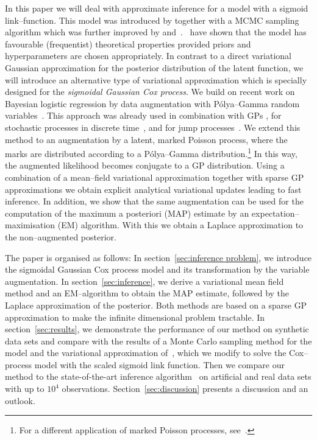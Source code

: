 \documentclass[twoside,11pt]{article}
\begin{document}
In this paper we will deal with approximate inference for a model with a sigmoid link--function.  This model was introduced by \citep{adams2009tractable} together with a MCMC sampling algorithm which was further improved by \citep{gunter2014efficient} and~\citep{teh2011gaussian}.~\citet{kirichenko2015optimality} have shown that the model has favourable (frequentist) theoretical properties provided priors and hyperparameters are chosen appropriately. In contrast to a direct variational Gaussian approximation for the posterior distribution of the latent function, we will introduce an alternative type of variational approximation which is specially designed for the {\em sigmoidal Gaussian Cox process}. We build on recent work on Bayesian logistic regression by data augmentation with P\'olya--Gamma random variables~\citep{polson2013bayesian}. This approach was already used in combination with GPs \citep{linderman2015dependent, wenzel2017scalable}, for stochastic processes in discrete time~\citep{linderman2017bayesian}, and for jump processes~\citep{donner2017inverse}. We extend this method to an augmentation by a latent, marked Poisson process, where the marks are distributed according to a P\'olya--Gamma distribution.\footnote{For a different application of marked Poisson processes, see~\citep{lloyd2016latent}.} In this way, the augmented likelihood becomes conjugate to a GP distribution. Using a combination of a mean--field variational approximation together with sparse GP approximations \citep{csato2002sparse,csato2002phd,titsias2009variational} we obtain explicit analytical variational updates leading to fast inference. In addition, we show that the same augmentation can be used for the computation of the maximum a posteriori (MAP) estimate by an expectation--maximisation (EM) algorithm. With this we obtain a Laplace approximation to the non--augmented posterior.

The paper is organised as follows: In section~\ref{sec:inference problem}, we introduce the sigmoidal Gaussian Cox process model and its transformation by the variable augmentation. In section~\ref{sec:inference}, we derive a variational mean field method and an EM--algorithm to obtain the MAP estimate, followed by the Laplace approximation of the posterior. Both methods are based on a sparse GP approximation to make the infinite dimensional problem tractable. In section~\ref{sec:results}, we demonstrate the  performance of our method on synthetic data sets and compare with the results of a Monte Carlo sampling method for the model and the variational approximation of~\citet{hensman2015mcmc}, which we modify to solve the Cox--process model with the scaled sigmoid link function. Then we compare our method to the state-of-the-art inference algorithm~\citep{lloyd2015variational} on artificial and real data sets with up to $10^4$ observations. Section~\ref{sec:discussion} presents a discussion and an outlook.
\end{document}
